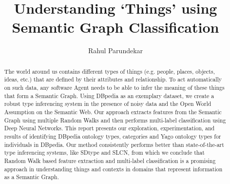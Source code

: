 \documentclass[runningheads,a4paper]{IEEEtran}
\newcommand{\myTitle}{Understanding `Things' using Semantic Graph Classification}
\newcommand{\myName}{Rahul Parundekar}
\begin{document}

\title{\myTitle}


%
%
\author{\myName}
%


%
%

\maketitle

\begin{abstract}
The world around us contains different types of things (e.g. people, places,
objects, ideas, etc.) that are defined by their attributes and relationship. To act automatically on such data, any software Agent needs to be able to infer the meaning of these things that form a Semantic Graph. Using DBpedia as an exemplary dataset, we create a robust type inferencing system in the presence of noisy data and the Open World Assumption on the Semantic Web. Our approach extracts features from the Semantic Graph using multiple Random Walks and then performs multi-label classification using Deep Neural Networks. This report presents our exploration, experimentation, and results of identifying DBpedia ontology types, categories and Yago ontology types for individuals in DBpedia. Our method consistently performs better than state-of-the-art type inferencing systems, like SDtype and SLCN, from which we conclude that Random Walk based feature extraction and multi-label classification is a promising approach in understanding things and contexts in domains that represent information as a Semantic Graph.
\end{abstract}
\end{document}
